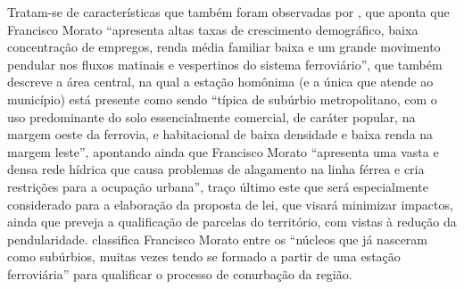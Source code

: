 	Tratam-se de características que também foram observadas por , que aponta que Francisco Morato ``apresenta altas taxas de crescimento demográfico,	baixa concentração de empregos, renda	média familiar baixa e um grande movimento pendular nos fluxos matinais e vespertinos do sistema ferroviário'', que também descreve a área central, na qual a estação homônima (e a única que atende ao município) está presente como sendo ``típica de subúrbio metropolitano, com o uso predominante do solo essencialmente comercial, de caráter popular, na margem oeste da ferrovia, e habitacional de baixa densidade e baixa renda na margem leste'', apontando ainda que Francisco Morato ``apresenta uma vasta e densa rede hídrica que causa problemas de alagamento na linha férrea e cria restrições para a ocupação urbana'', traço último este que será especialmente considerado para a elaboração da proposta de lei, que visará minimizar impactos, ainda que preveja a qualificação de parcelas do território, com vistas à redução da pendularidade.  classifica Francisco Morato entre os ``núcleos que já nasceram como subúrbios, muitas vezes tendo se formado a partir de uma estação ferroviária'' para qualificar o processo de conurbação da região.
	
